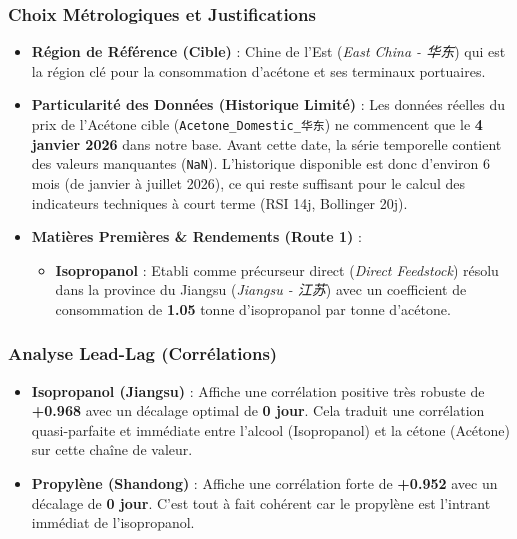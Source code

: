 \documentclass[12pt,a4paper]{article}
\begin{document}
\subsubsection{Choix Métrologiques et Justifications}
\begin{itemize}
    \item \textbf{Région de Référence (Cible)} : Chine de l'Est (\textit{East China - 华东}) qui est la région clé pour la consommation d'acétone et ses terminaux portuaires.
    \item \textbf{Particularité des Données (Historique Limité)} : Les données réelles du prix de l'Acétone cible (\texttt{Acetone\_Domestic\_华东}) ne commencent que le \textbf{4 janvier 2026} dans notre base. Avant cette date, la série temporelle contient des valeurs manquantes (\texttt{NaN}). L'historique disponible est donc d'environ 6 mois (de janvier à juillet 2026), ce qui reste suffisant pour le calcul des indicateurs techniques à court terme (RSI 14j, Bollinger 20j).
    \item \textbf{Matières Premières \& Rendements (Route 1)} :
    \begin{itemize}
        \item \textbf{Isopropanol} : Etabli comme précurseur direct (\textit{Direct Feedstock}) résolu dans la province du Jiangsu (\textit{Jiangsu - 江苏}) avec un coefficient de consommation de \textbf{1.05} tonne d'isopropanol par tonne d'acétone.
    \end{itemize}
\end{itemize}

\subsubsection{Analyse Lead-Lag (Corrélations)}
\begin{itemize}
    \item \textbf{Isopropanol (Jiangsu)} : Affiche une corrélation positive très robuste de \textbf{+0.968} avec un décalage optimal de \textbf{0 jour}. Cela traduit une corrélation quasi-parfaite et immédiate entre l'alcool (Isopropanol) et la cétone (Acétone) sur cette chaîne de valeur.
    \item \textbf{Propylène (Shandong)} : Affiche une corrélation forte de \textbf{+0.952} avec un décalage de \textbf{0 jour}. C'est tout à fait cohérent car le propylène est l'intrant immédiat de l'isopropanol.
\end{itemize}
\end{document}
